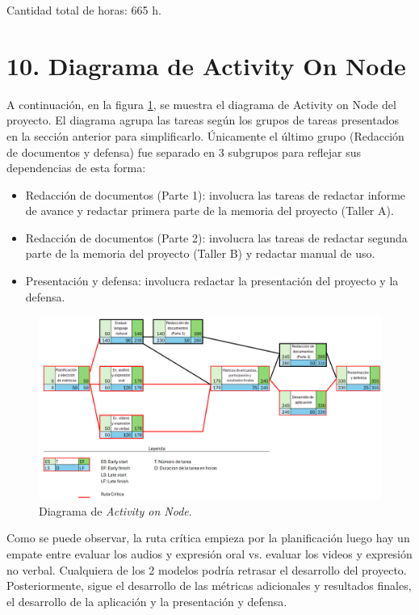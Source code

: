 \documentclass[
11pt, %
codirector, %
]{charter}
\begin{document}
Cantidad total de horas: 665 h.

\section{10. Diagrama de Activity On Node}
\label{sec:AoN}

A continuación, en la figura \ref{fig:AoN}, se muestra el diagrama de Activity on Node del proyecto. El diagrama agrupa las tareas según los grupos de tareas presentados en la sección anterior para simplificarlo. Únicamente el último grupo (Redacción de documentos y defensa) fue separado en 3 subgrupos para reflejar sus dependencias de esta forma:
\begin{itemize}
    \item Redacción de documentos (Parte 1): involucra las tareas de redactar informe de avance y redactar primera parte de la memoria del proyecto (Taller A).
    \item Redacción de documentos (Parte 2): involucra las tareas de redactar segunda parte de la memoria del proyecto (Taller B) y redactar manual de uso.
    \item Presentación y defensa: involucra redactar la presentación del proyecto y la defensa.
\end{itemize}


\begin{figure}[htpb]
\centering 
\includegraphics[width=1\textwidth]{./Figuras/Diagrama_AoN.png}
\caption{Diagrama de \textit{Activity on Node}.}
\label{fig:AoN}
\end{figure}

Como se puede observar, la ruta crítica empieza por la planificación luego hay un empate entre evaluar los audios y expresión oral vs. evaluar los videos y expresión no verbal. Cualquiera de los 2 modelos podría retrasar el desarrollo del proyecto. Posteriormente, sigue el desarrollo de las métricas adicionales y resultados finales, el desarrollo de la aplicación y la presentación y defensa.
\end{document}
